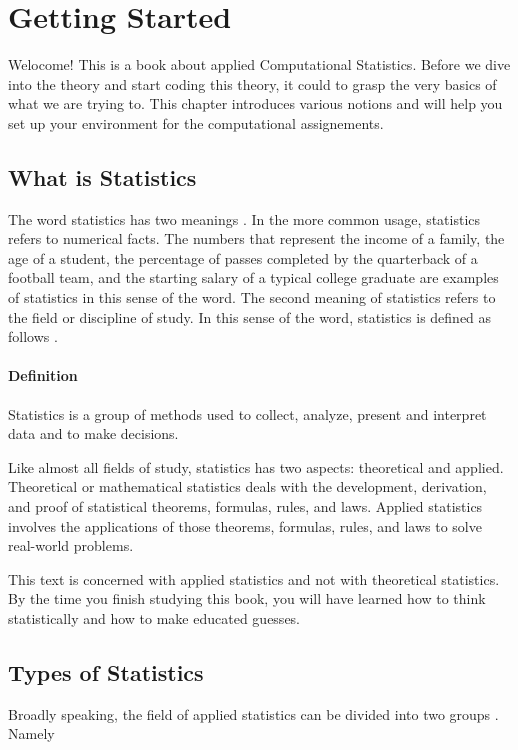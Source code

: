 \chapter{Getting Started}
\label{getting_started}
Welocome! This is a book about applied Computational Statistics. Before we dive into the theory and start coding this
theory, it could to grasp the very basics of what we are trying to. This chapter introduces various notions and will 
help you set up your environment for the computational assignements.

\section{What is Statistics}
The word statistics has two meanings \cite{Mann2010}. In the more common usage, statistics refers to numerical facts. The numbers that represent the income of a family, the age of a student, the percentage of passes completed by the quarterback of a football team, and the starting salary of a typical college graduate are examples of statistics in this sense of the word. The second meaning of statistics refers to the field or discipline of study. In this sense of
the word, statistics is defined as follows \cite{Mann2010}.

\subsubsection{Definition}
\label{stats_definition}
Statistics is a group of methods used to collect, analyze, present and interpret data and to make decisions.  

Like almost all fields of study, statistics has two aspects: theoretical and applied. Theoretical or mathematical statistics deals with the development, derivation, and proof of statistical
theorems, formulas, rules, and laws. Applied statistics involves the applications of those theorems, formulas, rules, and laws to solve real-world problems. 

This text is concerned with applied statistics and not with theoretical statistics. By the time you finish studying this book, you
will have learned how to think statistically and how to make educated guesses.

\section{Types of Statistics}
\label{types_stats}
Broadly speaking, the field of applied statistics can be divided into two groups \cite{Mann2010}. Namely

